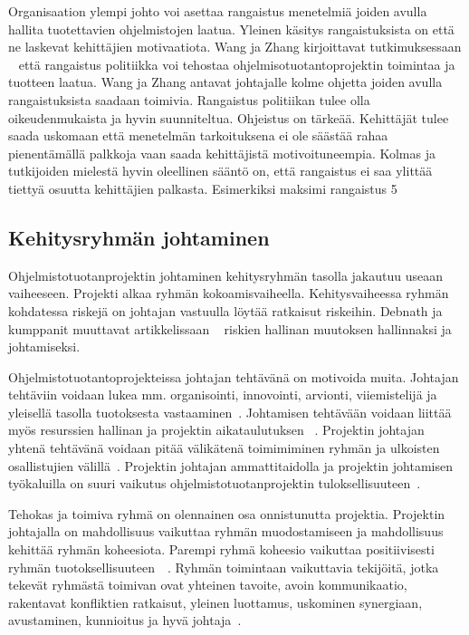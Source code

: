 \documentclass[finnish]{tktltiki2}
\theoremstyle{definition}
\theoremstyle{remark}
\begin{document}
Organisaation ylempi johto voi asettaa rangaistus menetelmiä joiden avulla hallita tuotettavien ohjelmistojen laatua. Yleinen käsitys rangaistuksista on että ne laskevat kehittäjien motivaatiota. Wang ja Zhang kirjoittavat tutkimuksessaan ~\cite{Wang:2010:PPP:1810295.1810302} että rangaistus politiikka voi tehostaa ohjelmisotuotantoprojektin toimintaa ja tuotteen laatua. Wang ja Zhang antavat johtajalle kolme ohjetta joiden avulla rangaistuksista saadaan toimivia. Rangaistus politiikan tulee olla oikeudenmukaista ja hyvin suunniteltua. Ohjeistus on tärkeää. Kehittäjät tulee saada uskomaan että menetelmän tarkoituksena ei ole säästää rahaa pienentämällä palkkoja vaan saada kehittäjistä motivoituneempia. Kolmas ja tutkijoiden mielestä hyvin oleellinen sääntö on, että rangaistus ei saa ylittää tiettyä osuutta kehittäjien palkasta. Esimerkiksi maksimi rangaistus 5%



\subsection{Kehitysryhmän johtaminen}

Ohjelmistotuotanprojektin johtaminen kehitysryhmän tasolla jakautuu useaan vaiheeseen. Projekti alkaa ryhmän kokoamisvaiheella. Kehitysvaiheessa ryhmän kohdatessa riskejä on johtajan vastuulla löytää ratkaisut riskeihin. Debnath ja kumppanit muuttavat artikkelissaan ~\cite{4017705} riskien hallinan muutoksen hallinnaksi ja johtamiseksi.  

Ohjelmistotuotantoprojekteissa johtajan tehtävänä on motivoida muita. Johtajan tehtäviin voidaan lukea mm. organisointi, innovointi, arvionti, viiemistelijä  ja yleisellä tasolla tuotoksesta vastaaminen~\cite{4017705}. Johtamisen tehtävään voidaan liittää myös resurssien hallinan ja projektin aikataulutuksen ~\cite{Dhomne:2012:ITL:2382887.2382899}. Projektin johtajan yhtenä tehtävänä voidaan pitää välikätenä toimimiminen ryhmän ja ulkoisten osallistujien välillä~\cite{McLeod:2011:FAS:1978802.1978803}.  Projektin johtajan ammattitaidolla ja projektin johtamisen työkaluilla on suuri vaikutus ohjelmistotuotanprojektin tuloksellisuuteen~\cite{McLeod:2011:FAS:1978802.1978803}. 

Tehokas ja toimiva ryhmä on olennainen osa onnistunutta projektia. Projektin johtajalla on mahdollisuus vaikuttaa ryhmän muodostamiseen ja mahdollisuus kehittää ryhmän koheesiota. Parempi ryhmä koheesio vaikuttaa positiivisesti ryhmän tuotoksellisuuteen~\cite{bahli2005group}~\cite{McLeod:2011:FAS:1978802.1978803}. Ryhmän toimintaan vaikuttavia tekijöitä, jotka tekevät ryhmästä toimivan ovat yhteinen tavoite, avoin kommunikaatio, rakentavat konfliktien ratkaisut, yleinen luottamus, uskominen synergiaan, avustaminen, kunnioitus ja hyvä johtaja~\cite{4017705}.
\end{document}
